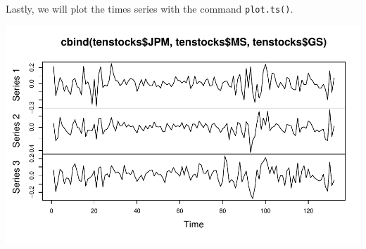 \documentclass[12pt,a4paper]{article}
\newenvironment{Shaded}{\begin{snugshade}}{\end{snugshade}}
\newcommand{\KeywordTok}[1]{\textcolor[rgb]{0.13,0.29,0.53}{\textbf{#1}}}
\newcommand{\NormalTok}[1]{#1}
\newcommand{\OperatorTok}[1]{\textcolor[rgb]{0.81,0.36,0.00}{\textbf{#1}}}
\begin{document}
Lastly, we will plot the times series with the command
\texttt{plot.ts()}.

\begin{Shaded}
\end{Shaded}

\includegraphics{solution_exercise_1_files/figure-latex/unnamed-chunk-9-1.pdf}
\end{document}
